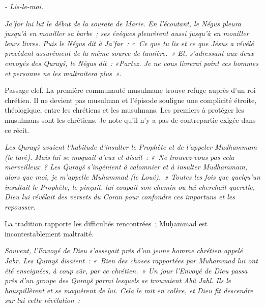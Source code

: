 \emph{- Lis-le-moi.}

\emph{Ja'far lui lut le début de la sourate de Marie. En l'écoutant, le
Négus pleura jusqu'à en mouiller sa barbe~; ses évêques pleurèrent aussi
jusqu'à en mouiller leurs livres. Puis le Négus dit à Ja'far~: «~Ce que
tu lis et ce que Jésus a révélé procèdent assurément de la même source
de lumière.~» Et, s'adressant aux deux envoyés des Qurayš, le Négus
dit~: «Partez. Je ne vous livrerai point ces hommes et personne ne les
maltraitera plus~».}

Passage clef. La première communauté musulmane trouve refuge auprès d'un
roi chrétien. Il ne devient pas musulman et l'épisode souligne une
complicité étroite, théologique, entre les chrétiens et les musulmans.
Les premiers à protéger les musulmans sont les chrétiens. Je note qu'il
n'y a pas de contrepartie exigée dans ce récit.


\emph{Les Qurayš avaient l'habitude d'insulter le Prophète et de
l'appeler Mudhammam (le taré). Mais lui se moquait d'eux et disait~:
«~Ne trouvez-vous pas cela merveilleux~? Les Qurayš s'ingénient à
calomnier et à insulter Mudhammam, alors que moi, je m'appelle Muhammad
(le Loué).~» Toutes les fois que quelqu'un insultait le Prophète, le
pinçait, lui coupait son chemin ou lui cherchait querelle, Dieu lui
révélait des versets du Coran pour confondre ces importuns et les
repousser.}

La tradition rapporte les difficultés rencontrées~; Muḥammad est
incontestablement maltraité.


\emph{Souvent, l'Envoyé de Dieu s'asseyait près d'un jeune homme
chrétien appelé Jabr. Les Qurayš disaient~: «~Bien des choses rapportées
par Muhammad lui ont été enseignées, à coup sûr, par ce chrétien.~» Un
jour l'Envoyé de Dieu passa près d'un groupe des Qurayš parmi lesquels
se trouvaient Abû Jahl. Ils le houspillèrent et se moquèrent de lui.
Cela le mit en colère, et Dieu fit descendre sur lui cette révélation~:}


